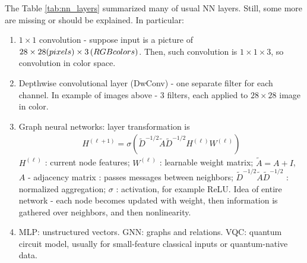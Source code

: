 \documentclass[aps, prb, superscriptaddress, longbibliography]{revtex4-2}
\numberwithin{equation}{section}
\begin{document}
The Table \ref{tab:nn_layers} summarized many of usual NN layers. Still, some more are missing or should be explained. In particular:
\begin{enumerate}
    \item $1\times 1$ convolution - suppose input is a picture of $28\times 28\text (pixels)\times 3\,\text(RGB colors)$. Then, such convolution is $1\times 1\times 3$, so convolution in color space.

    \item Depthwise convolutional layer (DwConv) - one separate filter for each channel. In example of images above - 3 filters, each applied to $28\times28$ image in color.

    \item Graph neural networks: layer transformation is
    \begin{align}
        H^{(\ell+1)}=\sigma\left(\tilde{D}^{-1 / 2} \tilde{A} \tilde{D}^{-1 / 2} H^{(\ell)} W^{(\ell)}\right)
    \end{align}
    $H^{(\ell)}$ : current node features; 
$W^{(\ell)}$ : learnable weight matrix;
$\tilde{A}=A+I$, $A$ - adjacency matrix : passes messages between neighbors; 
$\tilde{D}^{-1 / 2} \tilde{A} \tilde{D}^{-1 / 2}$ : normalized aggregation; 
$\sigma$ : activation, for example ReLU.
    Idea of entire network - each node becomes updated with weight, then information is gathered over neighbors, and then nonlinearity.\\

\item MLP: unstructured vectors. 
GNN: graphs and relations. 
VQC: quantum circuit model, usually for small-feature classical inputs or quantum-native data.
\end{enumerate}
\end{document}
